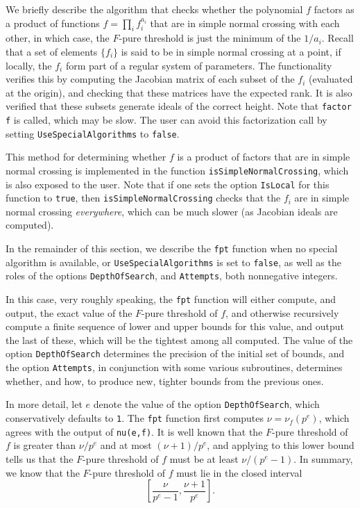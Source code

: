\documentclass{amsart}
\begin{document}
We briefly describe the algorithm that checks whether the polynomial $f$ factors as a product of functions $f = \prod_i f_i^{a_i}$ that are in simple normal crossing with each other, in which case, the $F$-pure threshold is just the minimum of the $1/a_i$. Recall that a set of elements $\{f_i\}$ is said to be in simple normal crossing at a point, if locally, the $f_i$ form part of a regular system of parameters.  The functionality verifies this by computing the Jacobian matrix of each subset of the $f_i$ (evaluated at the origin), and checking that these matrices have the expected rank.  It is also verified that these subsets generate ideals of the correct height.  Note that {\tt factor f} is called, which may be slow.  The user can avoid this factorization call by setting {\tt UseSpecialAlgorithms} to {\tt false}.

This method for determining whether $f$ is a product of factors that are in simple normal crossing is implemented in the function {\tt isSimpleNormalCrossing}, which is also exposed to the user.
Note that if one sets the option {\tt IsLocal} for this function to {\tt true}, then {\tt isSimpleNormalCrossing} checks that the $f_i$ are in simple normal crossing \emph{everywhere}, which can be much slower (as Jacobian ideals are computed).

In the remainder of this section, we describe the {\tt fpt} function when no special algorithm is available, or {\tt UseSpecialAlgorithms} is set to {\tt false},  as well as the roles of the options {\tt DepthOfSearch}, and {\tt Attempts}, both nonnegative integers.

In this case, very roughly speaking, the {\tt fpt} function will either compute, and output, the exact value of the $F$-pure threshold of $f$, and otherwise recursively compute a finite sequence of lower and upper bounds for this value, and output the last of these, which will be the tightest among all computed.  The value of the option {\tt DepthOfSearch} determines the precision of the initial set of bounds, and the option {\tt Attempts}, in conjunction with some various subroutines, determines whether, and how, to produce new, tighter bounds from the previous ones.

In more detail, let $e$ denote the value of the option {\tt DepthOfSearch}, which conservatively defaults to {\tt 1}.  The {\tt fpt} function first computes $\nu=\nu_f(p^e)$, which agrees with the output of {\tt nu(e,f)}.  It is well known that the $F$-pure threshold of $f$ is greater than $\nu/p^e$ and at most $(\nu+1)/p^e$, and applying  \cite[Proposition 4.2]{HernandezFPurityOfHypersurfaces} to this lower bound tells us that the $F$-pure threshold of $f$ must be at least $\nu/(p^e-1)$.  In summary, we know that the $F$-pure threshold of $f$ must lie in the closed interval
%
\begin{equation}
\label{estimating-interval: e}
\tag{$\dagger$}
\left[ \frac{\nu}{p^e-1}, \frac{\nu+1}{p^e} \right].
\end{equation}
\end{document}
